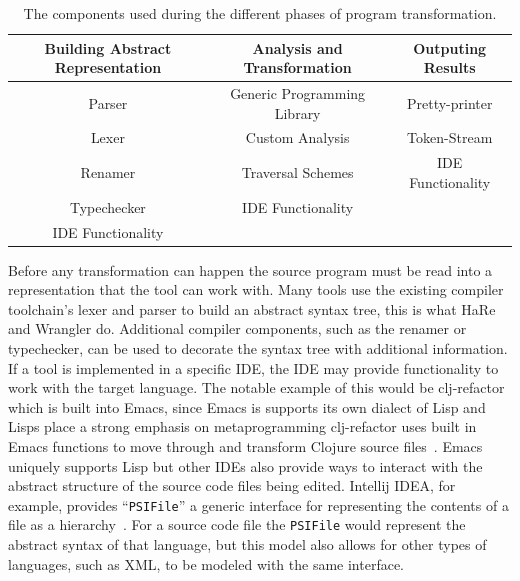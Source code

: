 \begin{table}
\centering
\begin{tabular}[t]{|c|c|c|}
\hline
Building Abstract Representation & Analysis and Transformation & Outputing Results \\
\hline
Parser & Generic Programming Library & Pretty-printer \\
Lexer & Custom Analysis & Token-Stream \\
Renamer & Traversal Schemes & IDE Functionality \\
Typechecker & IDE Functionality & \\
IDE Functionality & & \\
\hline
\end{tabular}
\caption{The components used during the different phases of program transformation.}
\label{transformPhases}
\end{table}

Before any transformation can happen the source program must be read into a representation that the tool can work with. Many tools use the existing compiler toolchain's lexer and parser to build an abstract syntax tree, this is what HaRe and Wrangler do. Additional compiler components, such as the renamer or typechecker, can be used to decorate the syntax tree with additional information. If a tool is implemented in a specific IDE, the IDE may provide functionality to work with the target language. The notable example of this would be clj-refactor which is built into Emacs, since Emacs is supports its own dialect of Lisp and Lisps place a strong emphasis on metaprogramming clj-refactor uses built in Emacs functions to move through and transform Clojure source files~\citep{clojureRefac}. Emacs uniquely supports Lisp but other IDEs also provide ways to interact with the abstract structure of the source code files being edited. Intellij IDEA, for example, provides ``\texttt{PSIFile}'' a generic interface for representing the contents of a file as a hierarchy~\citep{ideaPsi}. For a source code file the \texttt{PSIFile} would represent the abstract syntax of that language, but this model also allows for other types of languages, such as XML, to be modeled with the same interface.


